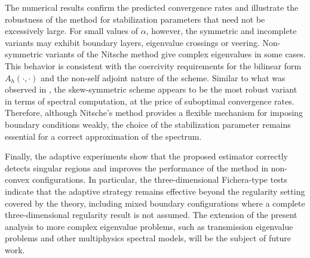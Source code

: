 \documentclass[onefignum,onetabnum,final]{siamart250211}
\numberwithin{equation}{section}
\newcommand\0{\boldsymbol{0}}
\begin{document}
The numerical results confirm the predicted convergence rates and illustrate the robustness of the method for stabilization parameters that need not be excessively large. For small values of $\alpha$, however, the symmetric and incomplete variants may exhibit boundary layers, eigenvalue crossings or veering. Non-symmetric variants of the Nitsche method give complex eigenvalues in some cases. This behavior is consistent with the coercivity requirements for the bilinear form $A_h(\cdot,\cdot)$ and the non-self adjoint nature of the scheme. Similar to what was observed in \cite{burman2012penalty}, the skew-symmetric scheme appears to be the most robust variant in terms of spectral computation, at the price of suboptimal convergence rates. Therefore, although Nitsche's method provides a flexible mechanism for imposing boundary conditions weakly, the choice of the stabilization parameter remains essential for a correct approximation of the spectrum.

Finally, the adaptive experiments show that the proposed estimator correctly detects singular regions and improves the performance of the method in non-convex configurations. In particular, the three-dimensional Fichera-type tests indicate that the adaptive strategy remains effective beyond the regularity setting covered by the theory, including mixed boundary configurations where a complete three-dimensional regularity result is not assumed. The extension of the present analysis to more complex eigenvalue problems, such as transmission eigenvalue problems and other multiphysics spectral models, will be the subject of future work.

	
	
	
	
	
	
	
	
\end{document}
